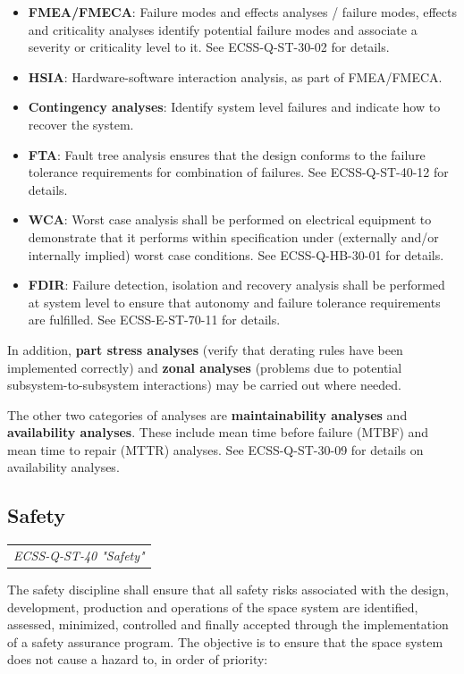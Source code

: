\begin{itemize}
\item \textbf{FMEA/FMECA}: Failure modes and effects analyses / failure modes, effects and criticality analyses identify potential failure modes and associate a severity or criticality level to it. See ECSS-Q-ST-30-02 \cite{ECSS-Q-ST-30-02} for details.
\item \textbf{HSIA}: Hardware-software interaction analysis, as part of FMEA/FMECA.
\item \textbf{Contingency analyses}: Identify system level failures and indicate how to recover the system.
\item \textbf{FTA}: Fault tree analysis ensures that the design conforms to the failure tolerance requirements for combination of failures. See ECSS-Q-ST-40-12 \cite{ECSS-Q-ST-40-12} for details.
\item \textbf{WCA}: Worst case analysis shall be performed on electrical equipment to demonstrate that it performs within specification under (externally and/or internally implied) worst case conditions. See ECSS-Q-HB-30-01 \cite{ECSS-Q-HB-30-01} for details.
\item \textbf{FDIR}: Failure detection, isolation and recovery analysis shall be performed at system level to ensure that autonomy and failure tolerance requirements are fulfilled. See ECSS-E-ST-70-11 \cite{ECSS-E-ST-70-11} for details.
\end{itemize}

In addition, \textbf{part stress analyses} (verify that derating rules have been implemented correctly) and \textbf{zonal analyses} (problems due to potential subsystem-to-subsystem interactions) may be carried out where needed.

The other two categories of analyses are \textbf{maintainability analyses} and \textbf{availability analyses}. These include mean time before failure (MTBF) and mean time to repair (MTTR) analyses. See ECSS-Q-ST-30-09 \cite{ECSS-Q-ST-30-09} for details on availability analyses.

\subsection{Safety}

\begin{tabular}{l}
\textit{ECSS-Q-ST-40 "Safety" \cite{ECSS-Q-ST-40}}
\end{tabular}

The safety discipline shall ensure that all safety risks associated with the design, development, production and operations of the space system are identified, assessed, minimized, controlled and finally accepted through the implementation of a safety assurance program. The objective is to ensure that the space system does not cause a hazard to, in order of priority:

